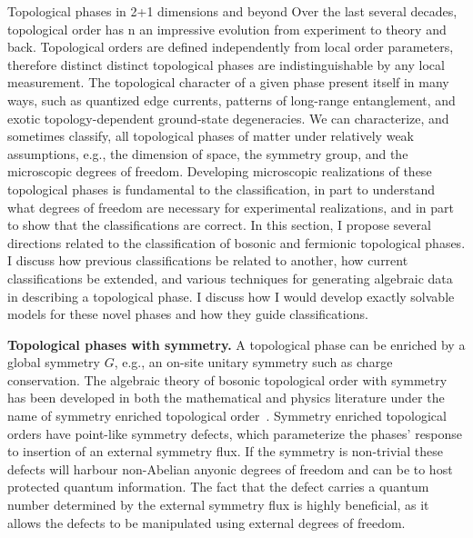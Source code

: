 {Topological phases in 2+1 dimensions and beyond}
Over the last several decades, topological order has n an impressive evolution from experiment to theory and back.
Topological orders are defined independently from local order parameters, therefore distinct distinct topological phases are indistinguishable by any local measurement.
The topological character of a given phase  present itself in many ways, 
such as quantized edge currents, 
patterns of long-range entanglement,
and exotic topology-dependent ground-state degeneracies.
We can characterize, and sometimes classify, all topological phases of matter under relatively weak assumptions, e.g., the dimension of space, the symmetry group, and the microscopic degrees of freedom.
Developing microscopic realizations of these topological phases is fundamental to the classification, 
in part to understand what degrees of freedom are necessary for experimental realizations, 
and in part to show that the classifications are correct. 
In this section, I propose several  directions related to the classification of bosonic and fermionic topological phases.
I discuss how previous classifications  be related to  another, 
how current classifications  be extended, 
and various techniques for generating  algebraic data  in describing a topological phase.
I  discuss how I would develop exactly solvable models for these novel  phases and how they  guide classifications.


\hfill \break
{\large \textbf{Topological phases with symmetry.}}
A topological phase can be enriched by a global symmetry $G$, e.g., an on-site unitary symmetry such as charge conservation.
The algebraic theory of bosonic topological order with symmetry has been developed in both the mathematical and physics literature under the name of symmetry enriched topological order~\cite{Etingof2009,Bark2019}. 
Symmetry enriched topological orders have point-like symmetry defects, which parameterize the phases' response to insertion of an external symmetry flux.
If the symmetry is non-trivial these defects will harbour non-Abelian anyonic degrees of freedom and can be  to host protected quantum information.
The fact that the defect carries a quantum number determined by the external symmetry flux is highly beneficial, 
as it allows the defects to be manipulated using external degrees of freedom. 



